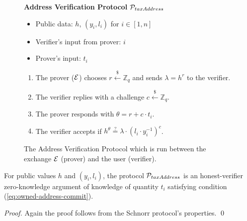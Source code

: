 \begin{figure}[h]
\begin{mdframed}

\begin{center}
    \textbf{Address Verification Protocol} $\mathcal{P}_{taxAddress}$
\end{center}

    \begin{itemize}
        \item Public data: $h$, $(y_i, l_i)$ for $i \in [1, n]$
        \item Verifier's input from prover: $i$
        \item Prover's input: $t_i$
    \end{itemize}

    \begin{enumerate}
        \item The prover ($\mathcal{E}$) chooses $r \xleftarrow{\$} \mathbb{Z}_q$
            and sends $\lambda = h^r$ to the verifier.
        \item The verifier replies with a challenge $c \xleftarrow{\$} \mathbb{Z}_q$.
        \item The prover responds with $\theta = r + c \cdot t_i$.
        \item The verifier accepts if $h^\theta \stackrel{?}{=} \lambda \cdot (l_i \cdot y_i^{-1})^c$.
    \end{enumerate}

\end{mdframed}
\caption{
    The Address Verification Protocol which is run between the exchange $\mathcal{E}$
    (prover) and the user (verifier).
}
\label{fig:taxation_verification_proto}
\end{figure}

\begin{theorem}
    For public values $h$ and $(y_i, l_i)$, the protocol
    $\mathcal{P}_{taxAddress}$ is an honest-verifier zero-knowledge argument of
    knowledge of quantity $t_i$ satisfying condition (\ref{eq:owned-address-commit}).
\end{theorem}
\begin{proof}
    Again the proof follows from the Schnorr protocol's properties. \qed
\end{proof}

